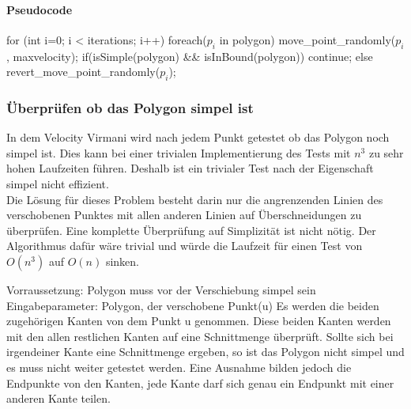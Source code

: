 \paragraph{Pseudocode}

\begin{code}[mathescape=true]
for (int i=0; i < iterations; i++)
{
	foreach($p_i$ in polygon)
	{
		move_point_randomly($p_i$, maxvelocity);
		if(isSimple(polygon) && isInBound(polygon))
			continue;
		else
			revert_move_point_randomly($p_i$);
	}
}
\end{code}

\subsubsection{Überprüfen ob das Polygon simpel ist}
In dem Velocity Virmani wird nach jedem Punkt getestet ob das Polygon noch simpel ist. Dies kann bei einer trivialen Implementierung des Tests mit $n^3$ zu sehr hohen Laufzeiten führen.
Deshalb ist ein trivialer Test nach der Eigenschaft simpel nicht effizient.\smallskip \\ 
Die Lösung für dieses Problem besteht darin nur die angrenzenden Linien des verschobenen Punktes mit allen anderen Linien auf Überschneidungen zu überprüfen. Eine komplette Überprüfung auf Simplizität ist nicht nötig.
Der Algorithmus dafür wäre trivial und würde die Laufzeit für einen Test von $O(n^3)$ auf $O(n)$ sinken.

Vorraussetzung: Polygon muss vor der Verschiebung simpel sein
Eingabeparameter: Polygon, der verschobene Punkt(u)
Es werden die beiden zugehörigen Kanten von dem Punkt u genommen. Diese beiden Kanten werden mit den allen restlichen Kanten auf eine Schnittmenge überprüft. Sollte sich bei irgendeiner Kante eine Schnittmenge ergeben, so ist das Polygon nicht simpel und es muss nicht weiter getestet werden. Eine Ausnahme bilden jedoch die Endpunkte von den Kanten, jede Kante darf sich genau ein Endpunkt mit einer anderen Kante teilen.


